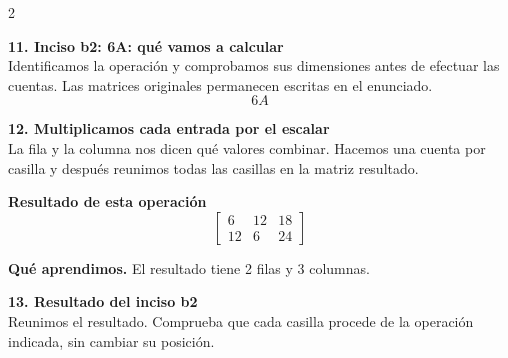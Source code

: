 \documentclass[11pt,a4paper,landscape]{article}
\begin{document}
\begin{multicols*}{2}
\begin{minipage}{\linewidth}
\end{minipage}\par\medskip
\noindent\begin{minipage}{\linewidth}\textbf{11. Inciso b2: 6A: qué vamos a calcular}\\[2pt]Identificamos la operación y comprobamos sus dimensiones antes de efectuar las cuentas. Las matrices originales permanecen escritas en el enunciado.
\[6A\]
\end{minipage}\par\medskip
\noindent\begin{minipage}{\linewidth}\textbf{12. Multiplicamos cada entrada por el escalar}\\[2pt]La fila y la columna nos dicen qué valores combinar. Hacemos una cuenta por casilla y después reunimos todas las casillas en la matriz resultado.
\par{}\par\smallskip
\par\smallskip \textbf{Resultado de esta operación}\[\begin{bmatrix}6 & 12 & 18\\12 & 6 & 24\end{bmatrix}\]
\par\smallskip\textbf{Qué aprendimos.} El resultado tiene 2 filas y 3 columnas.
\end{minipage}\par\medskip
\noindent\begin{minipage}{\linewidth}\textbf{13. Resultado del inciso b2}\\[2pt]Reunimos el resultado. Comprueba que cada casilla procede de la operación indicada, sin cambiar su posición.

\end{minipage}
\end{multicols*}
\end{document}

